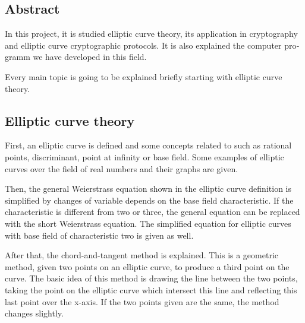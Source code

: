\begingroup
\let\clearpage\relax
\let\cleardoublepage\relax
\let\cleardoublepage\relax

\begin{otherlanguage}{american}

\chapter*{Abstract}


In this project, it is studied elliptic curve theory, its application in cryptography and elliptic curve cryptographic protocols. It is also explained the computer programm we have developed in this field.

Every main topic is going to be explained briefly starting with elliptic curve theory.

\section*{Elliptic curve theory}

First, an elliptic curve is defined and some concepts related to such as rational points, discriminant, point at infinity or base field. Some examples of elliptic curves over the field of real numbers and their graphs are given.

Then, the general Weierstrass equation shown in the elliptic curve definition is simplified by changes of variable depends on the base field characteristic. If the characteristic is different from two or three, the general equation can be replaced with the short Weierstrass equation. The simplified equation for elliptic curves with base field of characteristic two is given as well.

After that, the chord-and-tangent method is explained. This is a geometric method, given two points on an elliptic curve, to produce a third point on the curve. The basic idea of this method is drawing the line between the two points, taking the point on the elliptic curve which intersect this line and reflecting this last point over the x-axis. If the two points given are the same, the method changes slightly.


\end{otherlanguage}
